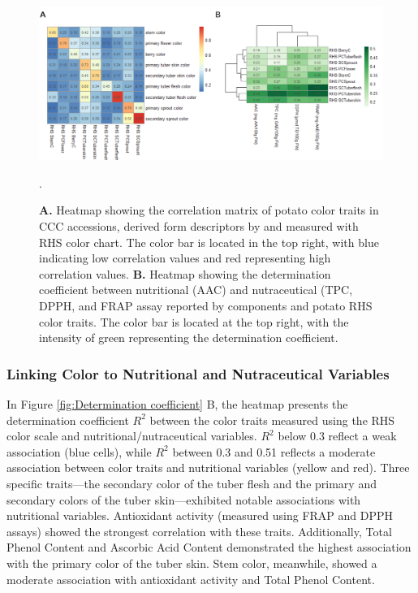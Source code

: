 \documentclass[pdflatex,sn-mathphys-ay]{sn-jnl}%
\begin{document}
\begin{figure}[h]
    \centering
    
    \includegraphics[width=12cm]{Figures/FigPanel_correlacion.png}
\caption{\textbf{A.} Heatmap showing the correlation matrix of potato color traits in CCC accessions, derived form  descriptors by \cite{gomez2000guia} and measured with RHS \citep{voss2002royal} color chart. The color bar is located in the top right, with blue indicating low correlation values and red representing high correlation values. \textbf{B.} Heatmap showing the determination coefficient between nutritional (AAC) and nutraceutical (TPC, DPPH, and FRAP assay reported by \citep{berdugo2023phenotypic} components and potato RHS color traits.  The color bar is located at the top right, with the intensity of green representing the determination coefficient. \label{fig:Determination coefficient} \label{fig:Correlations-years}}. 

\end{figure}


\subsubsection{Linking Color to Nutritional and Nutraceutical Variables}
In Figure \ref{fig:Determination coefficient} B, the heatmap presents the determination coefficient $R^2$ between the color traits measured using the RHS color scale and nutritional/nutraceutical variables. $R^2$ below 0.3 reflect a weak association (blue cells), while $R^2$ between 0.3 and 0.51 reflects a moderate association between color traits and nutritional variables (yellow and red). Three specific traits—the secondary color of the tuber flesh and the primary and secondary colors of the tuber skin—exhibited notable associations with nutritional variables. Antioxidant activity (measured using FRAP and DPPH assays) showed the strongest correlation with these traits. Additionally, Total Phenol Content and Ascorbic Acid Content demonstrated the highest association with the primary color of the tuber skin. Stem color, meanwhile, showed a moderate association with antioxidant activity and Total Phenol Content.
\end{document}

